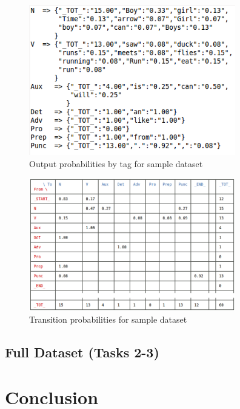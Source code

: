 \documentclass[11pt]{article}
\begin{document}
\begin{figure}[ht!]
    \centering
    \includegraphics[width=90mm]{img/sample_outputs.png}
    \caption{Output probabilities by tag for sample dataset}
    \label{fig:sampleHmm_out}
\end{figure}

\begin{figure}[ht!]
    \centering
    \includegraphics[width=90mm]{img/sample_transitions.png}
    \caption{Transition probabilities for sample dataset}
    \label{fig:sampleHmm_trans}
\end{figure}



\subsection{Full Dataset (Tasks 2-3)}


\section{Conclusion}
\end{document}
